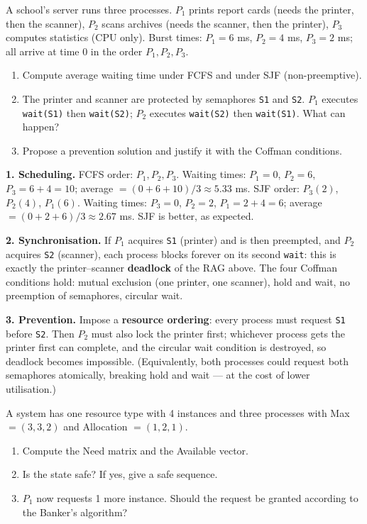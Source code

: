 \documentclass[11pt]{article}
\begin{document}
\begin{exoresolu}
A school's server runs three processes. $P_1$ prints report cards (needs the printer, then the scanner), $P_2$ scans archives (needs the scanner, then the printer), $P_3$ computes statistics (CPU only). Burst times: $P_1 = 6$ ms, $P_2 = 4$ ms, $P_3 = 2$ ms; all arrive at time $0$ in the order $P_1, P_2, P_3$.
\begin{enumerate}
\item Compute average waiting time under FCFS and under SJF (non-preemptive).
\item The printer and scanner are protected by semaphores \texttt{S1} and \texttt{S2}. $P_1$ executes \texttt{wait(S1)} then \texttt{wait(S2)}; $P_2$ executes \texttt{wait(S2)} then \texttt{wait(S1)}. What can happen?
\item Propose a prevention solution and justify it with the Coffman conditions.
\end{enumerate}
\tcblower
\textbf{1. Scheduling.} FCFS order: $P_1, P_2, P_3$. Waiting times: $P_1 = 0$, $P_2 = 6$, $P_3 = 6+4 = 10$; average $= (0+6+10)/3 \approx 5.33$ ms. SJF order: $P_3 (2)$, $P_2 (4)$, $P_1 (6)$. Waiting times: $P_3 = 0$, $P_2 = 2$, $P_1 = 2+4 = 6$; average $= (0+2+6)/3 \approx 2.67$ ms. SJF is better, as expected.

\textbf{2. Synchronisation.} If $P_1$ acquires \texttt{S1} (printer) and is then preempted, and $P_2$ acquires \texttt{S2} (scanner), each process blocks forever on its second \texttt{wait}: this is exactly the printer--scanner \textbf{deadlock} of the RAG above. The four Coffman conditions hold: mutual exclusion (one printer, one scanner), hold and wait, no preemption of semaphores, circular wait.

\textbf{3. Prevention.} Impose a \textbf{resource ordering}: every process must request \texttt{S1} before \texttt{S2}. Then $P_2$ must also lock the printer first; whichever process gets the printer first can complete, and the circular wait condition is destroyed, so deadlock becomes impossible. (Equivalently, both processes could request both semaphores atomically, breaking hold and wait --- at the cost of lower utilisation.)
\end{exoresolu}

\begin{exercice}
A system has one resource type with 4 instances and three processes with Max $= (3, 3, 2)$ and Allocation $= (1, 2, 1)$.
\begin{enumerate}
\item Compute the Need matrix and the Available vector.
\item Is the state safe? If yes, give a safe sequence.
\item $P_1$ now requests 1 more instance. Should the request be granted according to the Banker's algorithm?
\end{enumerate}
\end{exercice}
\end{document}
